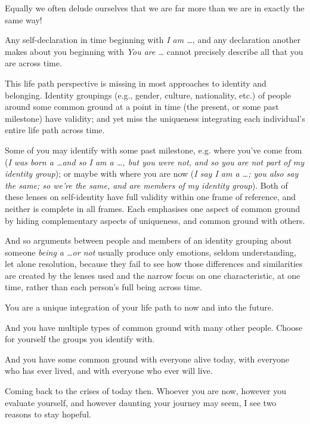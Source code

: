Equally we often delude ourselves that we are far more than we are in exactly the same way!


Any self-declaration in time beginning with \emph{I am \ldots}, and any declaration another makes about you beginning with \emph{You are \ldots} cannot precisely describe all that you are across time.


This life path perspective is missing in most approaches to identity and belonging. Identity groupings (e.g., gender, culture, nationality, etc.) of people around some common ground at a point in time (the present, or some past milestone) have validity; and yet miss the uniqueness integrating each individual’s entire life path across time.


Some of you may identify with some past milestone, e.g. where you’ve come from (\emph{I was born a \ldots and so I am a \ldots, but you were not, and so you are not part of my identity group}); or maybe with where you are now (\emph{I say I am a \ldots; you also say the same; so we’re the same, and are members of my identity group}). Both of these lenses on self-identity have full validity within one frame of reference, and neither is complete in all frames. Each emphasises one aspect of common ground by hiding complementary aspects of uniqueness, and common ground with others. 


And so arguments between people and members of an identity grouping about someone \emph{being a \ldots or not} usually produce only emotions, seldom understanding, let alone resolution, because they fail to see how those differences and similarities are created by the lenses used and the narrow focus on one characteristic, at one time, rather than each person’s full being across time. 


You are a unique integration of your life path to now and into the future. 


And you have multiple types of common ground with many other people. Choose for yourself the groups you identify with.


And you have some common ground with everyone alive today, with everyone who has ever lived, and with everyone who ever will live.


Coming back to the crises of today then. Whoever you are now, however you evaluate yourself, and however daunting your journey may seem, I see two reasons to stay hopeful.


